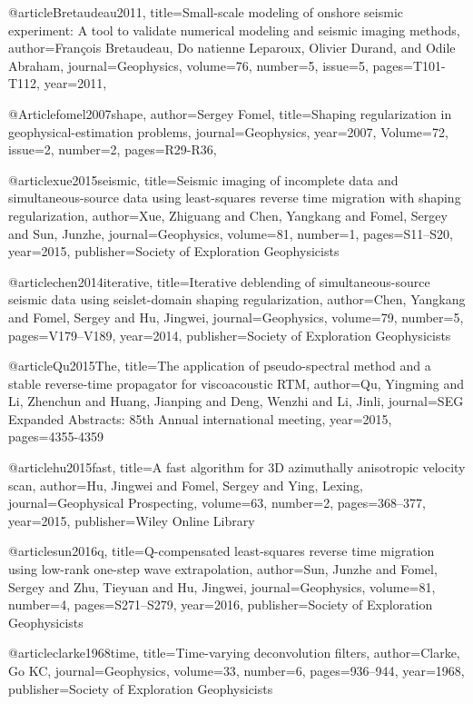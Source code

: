 @article{Bretaudeau2011,
  title={Small-scale modeling of onshore seismic experiment: A tool to validate numerical modeling and seismic imaging methods},
  author={François Bretaudeau, Do natienne Leparoux, Olivier Durand, and Odile Abraham},
  journal={Geophysics},
  volume={76},
  number={5},
  issue=5,
  pages={T101-T112},
  year={2011},
}

@Article{fomel2007shape,
  author={Sergey Fomel},
  title={Shaping regularization in geophysical-estimation problems},
  journal={Geophysics},
  year=2007,
  Volume=72,
  issue=2,
  number=2,
  pages={R29-R36},
}

@article{xue2015seismic,
  title={Seismic imaging of incomplete data and simultaneous-source data using least-squares reverse time migration with shaping regularization},
  author={Xue, Zhiguang and Chen, Yangkang and Fomel, Sergey and Sun, Junzhe},
  journal={Geophysics},
  volume={81},
  number={1},
  pages={S11--S20},
  year={2015},
  publisher={Society of Exploration Geophysicists}
}

@article{chen2014iterative,
  title={Iterative deblending of simultaneous-source seismic data using seislet-domain shaping regularization},
  author={Chen, Yangkang and Fomel, Sergey and Hu, Jingwei},
  journal={Geophysics},
  volume={79},
  number={5},
  pages={V179--V189},
  year={2014},
  publisher={Society of Exploration Geophysicists}
}

@article{Qu2015The,
  title={The application of pseudo-spectral method and a stable reverse-time propagator for viscoacoustic {RTM}},
  author={Qu, Yingming and Li, Zhenchun and Huang, Jianping and Deng, Wenzhi and Li, Jinli},
  journal={SEG Expanded Abstracts: 85th Annual international meeting},
  year={2015},
  pages={4355-4359}
}

@article{hu2015fast,
  title={A fast algorithm for 3{D} azimuthally anisotropic velocity scan},
  author={Hu, Jingwei and Fomel, Sergey and Ying, Lexing},
  journal={Geophysical Prospecting},
  volume={63},
  number={2},
  pages={368--377},
  year={2015},
  publisher={Wiley Online Library}
}

@article{sun2016q,
  title={Q-compensated least-squares reverse time migration using low-rank one-step wave extrapolation},
  author={Sun, Junzhe and Fomel, Sergey and Zhu, Tieyuan and Hu, Jingwei},
  journal={Geophysics},
  volume={81},
  number={4},
  pages={S271--S279},
  year={2016},
  publisher={Society of Exploration Geophysicists}
}

@article{clarke1968time,
  title={Time-varying deconvolution filters},
  author={Clarke, Go KC},
  journal={Geophysics},
  volume={33},
  number={6},
  pages={936--944},
  year={1968},
  publisher={Society of Exploration Geophysicists}
}

